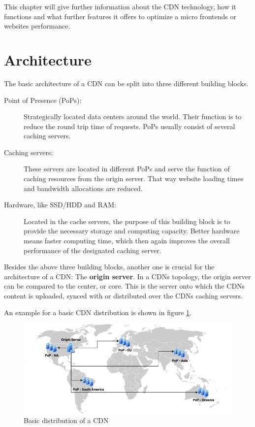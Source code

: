 This chapter will give further information about the CDN technology, how it functions and what further features it offers to optimize a micro frontends or websites performance.

\section{Architecture}

The basic architecture of a CDN can be split into three different building blocks.

\begin{description}
	\item[Point of Presence (PoPs):] Strategically located data centers around the world. Their function is to reduce the round trip time of requests. PoPs usually consist of several caching servers.
	\item[Caching servers:] These servers are located in different PoPs and serve the function of caching resources from the origin server. That way website loading times and bandwidth allocations are reduced.
	\item[Hardware, like SSD/HDD and RAM:] Located in the cache servers, the purpose of this building block is to provide the necessary storage and computing capacity. Better hardware means faster computing time, which then again improves the overall performance of the designated caching server.
\end{description}

Besides the above three building blocks, another one is crucial for the architecture of a CDN: The \textbf{origin server}. In a CDNs topology, the origin server can be compared to the center, or core. This is the server onto which the CDNs content is uploaded, synced with or distributed over the CDNs caching servers.\cite{cdn_origin_server}

An example for a basic CDN distribution is shown in figure \ref{fig:cdn_general_arch}.

\begin{figure}[!h]
	\centering
	\includegraphics[width=1\textwidth]{Figures/basic_cdn_arch.drawio.png}
	\caption{Basic distribution of a CDN}
	\label{fig:cdn_general_arch}
\end{figure}

